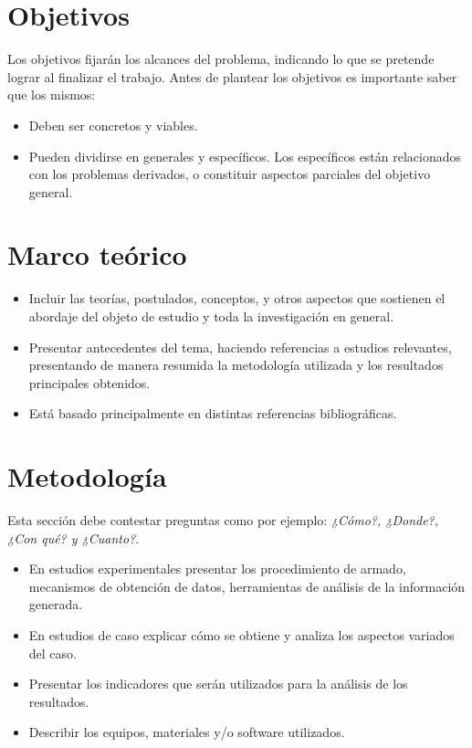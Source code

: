 \documentclass{article}[11pt]
\begin{document}
\section{Objetivos}
Los objetivos fijarán los alcances del problema, indicando lo que se pretende lograr al finalizar el trabajo. Antes de plantear los objetivos es importante saber que los mismos:\\

\begin{itemize}
\item Deben ser concretos y viables.
\item Pueden dividirse en generales y específicos. Los específicos están relacionados con los problemas derivados, o constituir aspectos parciales del objetivo general.
\end{itemize}

\section{Marco teórico}
\begin{itemize}
\item Incluir las teorías, postulados, conceptos, y otros aspectos que sostienen el abordaje del objeto de estudio y toda la investigación en general. 
\item Presentar antecedentes del tema, haciendo referencias a estudios relevantes, presentando de manera resumida la metodología utilizada y los resultados principales obtenidos. 
\item Está basado principalmente en distintas referencias bibliográficas. 
\end{itemize}

\section{Metodología}
Esta sección debe contestar preguntas como por ejemplo: \textit{¿Cómo?, ¿Donde?, ¿Con qué? y ¿Cuanto?}.\\
\begin{itemize}
\item En estudios experimentales presentar los procedimiento de armado, mecanismos de obtención de datos, herramientas de análisis de la información generada.
\item En estudios de caso explicar cómo se obtiene y analiza los aspectos variados del caso.
\item Presentar los indicadores que serán utilizados para la análisis de los resultados.
\item Describir los equipos, materiales y/o software utilizados.
\end{itemize}
\end{document}
